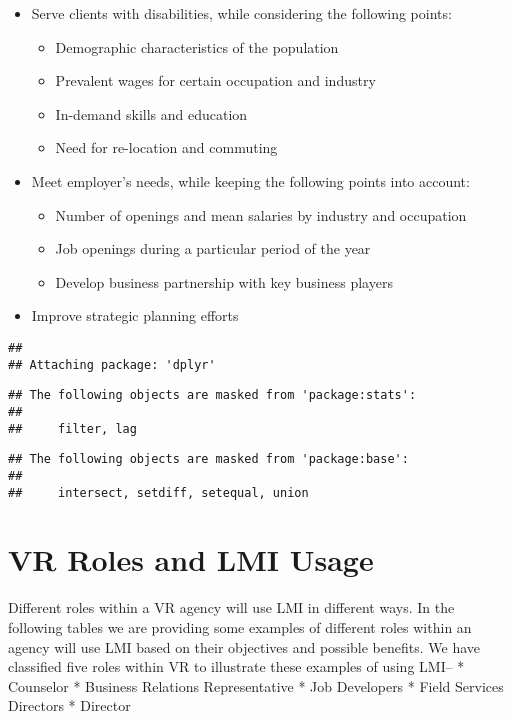 \documentclass[]{book}
\providecommand{\tightlist}{%
  \setlength{\itemsep}{0pt}\setlength{\parskip}{0pt}}
\theoremstyle{definition}
\theoremstyle{definition}
\theoremstyle{definition}
\theoremstyle{remark}
\begin{document}
\begin{itemize}
\tightlist
\item
  Serve clients with disabilities, while considering the following
  points:

  \begin{itemize}
  \tightlist
  \item
    Demographic characteristics of the population
  \item
    Prevalent wages for certain occupation and industry
  \item
    In-demand skills and education
  \item
    Need for re-location and commuting
  \end{itemize}
\item
  Meet employer's needs, while keeping the following points into
  account:

  \begin{itemize}
  \tightlist
  \item
    Number of openings and mean salaries by industry and occupation
  \item
    Job openings during a particular period of the year
  \item
    Develop business partnership with key business players
  \end{itemize}
\item
  Improve strategic planning efforts
\end{itemize}

\begin{verbatim}
## 
## Attaching package: 'dplyr'
\end{verbatim}

\begin{verbatim}
## The following objects are masked from 'package:stats':
## 
##     filter, lag
\end{verbatim}

\begin{verbatim}
## The following objects are masked from 'package:base':
## 
##     intersect, setdiff, setequal, union
\end{verbatim}

\chapter{VR Roles and LMI Usage}\label{vr-roles-and-lmi-usage}

Different roles within a VR agency will use LMI in different ways. In
the following tables we are providing some examples of different roles
within an agency will use LMI based on their objectives and possible
benefits. We have classified five roles within VR to illustrate these
examples of using LMI-- * Counselor * Business Relations Representative
* Job Developers * Field Services Directors * Director
\end{document}

